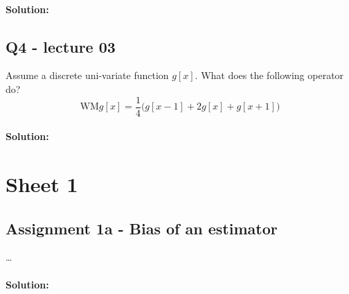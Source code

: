 \paragraph{Solution:} 

\subsection{Q4 - lecture 03} 
Assume a discrete uni-variate function $g[x]$. What does the following operator do?
\begin{equation}
	\text{WM}g[x] = \frac{1}{4}\big( g[x-1] + 2g[x] + g[x+1] \big)
\end{equation}
\paragraph{Solution:} 



\newpage
\section{Sheet 1}

\subsection{Assignment 1a - Bias of an estimator} 
\dots
\paragraph{Solution:} 
